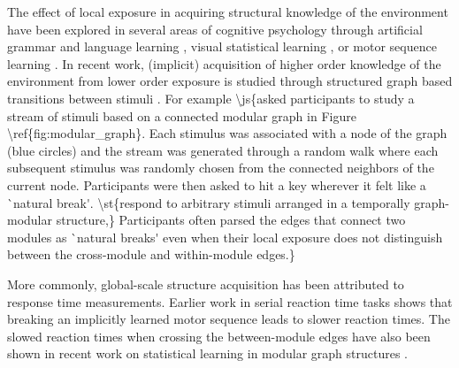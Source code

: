 The effect of local exposure in acquiring structural knowledge of the environment have been explored in several areas of cognitive psychology through artificial grammar and language learning \cite{knowlton1992intact, romberg2010statistical, aslin2012statistical, dehaene2015neural}, visual statistical learning \cite{fiser2002statistical, turk2008multidimensional, brady2008statistical}, or motor sequence learning \cite{baldwin2008segmenting, nissen1987attentional, cleeremans1991learning, kahn2018network}. In recent work, (implicit) acquisition of higher order knowledge of the environment from lower order exposure is studied through structured graph based transitions between stimuli \cite{schapiro2013neural, karuza2017process, kahn2018network, lynn2020humans, lynn2020human, karuza2022value}. For example \cite{schapiro2013neural} \ac{\js{asked participants to study a stream of stimuli based on a connected modular graph in Figure \ref{fig:modular_graph}. Each stimulus was associated with a node of the graph (blue circles) and the stream was generated through a random walk where each subsequent stimulus was randomly chosen from the connected neighbors of the current node. Participants were then asked to hit a key wherever it felt like a `natural break'. \st{respond to arbitrary stimuli arranged in a temporally graph-modular structure,} Participants often parsed the edges that connect two modules as `natural breaks' even when their local exposure does not distinguish between the cross-module and within-module edges.}} 

More commonly, global-scale structure acquisition has been attributed to response time measurements. Earlier work in serial reaction time tasks \cite{nissen1987attentional, cleeremans1991learning} shows that breaking an implicitly learned motor sequence leads to slower reaction times. The slowed reaction times when crossing the between-module edges have also been shown in recent work on statistical learning in modular graph structures \cite{kahn2018network, lynn2020humans, karuza2017process, karuza2022value, karuza2019human, lynn2020human}. 

